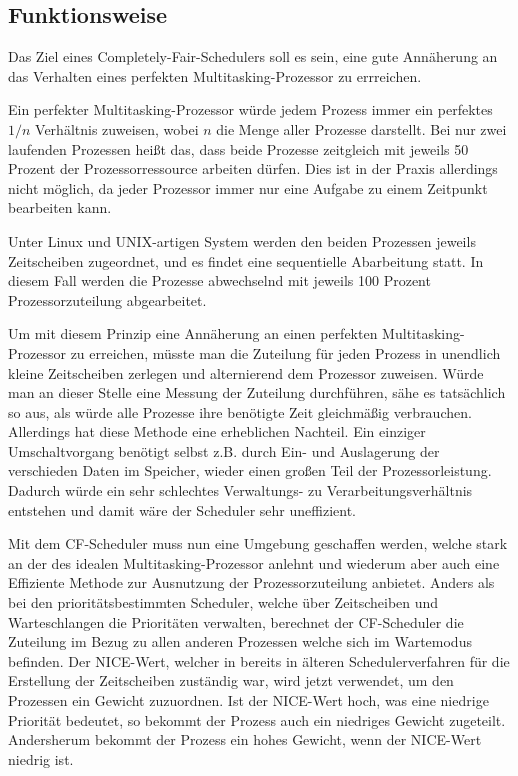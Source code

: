 \subsection{Funktionsweise}
Das Ziel eines \glqq Completely-Fair-Schedulers\grqq{} soll es sein, eine gute Annäherung an das Verhalten eines perfekten Multitasking-Prozessor zu errreichen.

Ein perfekter Multi\-tasking-Prozessor würde jedem Prozess immer ein perfektes $1/n$ Verhältnis zuweisen, wobei $n$ die Menge aller Prozesse darstellt. 
Bei nur zwei laufenden Prozessen heißt das, dass beide Prozesse zeitgleich mit jeweils 50 Prozent der Prozessorressource arbeiten dürfen. Dies ist in der Praxis allerdings nicht möglich, da jeder Prozessor immer nur eine Aufgabe zu einem Zeitpunkt bearbeiten kann.

Unter Linux und UNIX-artigen System werden den beiden Prozessen jeweils Zeitscheiben zugeordnet, und es findet eine sequentielle Abarbeitung statt. In diesem Fall werden die Prozesse abwechselnd mit jeweils 100 Prozent Prozessorzuteilung abgearbeitet.

Um mit diesem Prinzip eine Annäherung an einen perfekten Multitasking-Prozessor zu erreichen, müsste man die Zuteilung für jeden Prozess in unendlich kleine Zeitscheiben zerlegen und alternierend dem Prozessor zuweisen. Würde man an dieser Stelle eine Messung der Zuteilung durchführen, sähe es tatsächlich so aus, als würde alle Prozesse ihre benötigte Zeit gleichmäßig verbrauchen.
Allerdings hat diese Methode eine erheblichen Nachteil. Ein einziger Umschalt\-vorgang be\-nötigt selbst z.B. durch Ein- und Auslagerung der verschieden Daten im Speicher, wieder einen großen Teil der Prozessorleistung. Dadurch würde ein sehr schlechtes Verwaltungs- zu Verarbeitungsverhältnis entstehen und damit wäre der Scheduler sehr uneffizient.

Mit dem CF-Scheduler muss nun eine Umgebung geschaffen werden, welche stark an der des idealen Multitasking-Prozessor anlehnt und wiederum aber auch eine Effiziente Methode zur Ausnutzung der Prozessorzuteilung anbietet.
Anders als bei den prioritätsbestimmten Scheduler, welche über Zeitscheiben und Warteschlangen die Prioritäten verwalten, berechnet der CF-Scheduler die Zuteilung im Bezug zu allen anderen Prozessen welche sich im Wartemodus befinden. Der \glqq NICE\grqq-Wert, welcher in bereits in älteren Scheduler\-ver\-fahren für die Erstellung der Zeitscheiben zuständig war, wird jetzt verwendet, um den Prozessen ein Gewicht zuzuordnen. Ist der \glqq NICE\grqq-Wert hoch, was eine niedrige Priorität bedeutet, so bekommt der Prozess auch ein niedriges Gewicht zugeteilt. Andersherum bekommt der Prozess ein hohes Gewicht, wenn der \glqq NICE\grqq-Wert niedrig ist.

